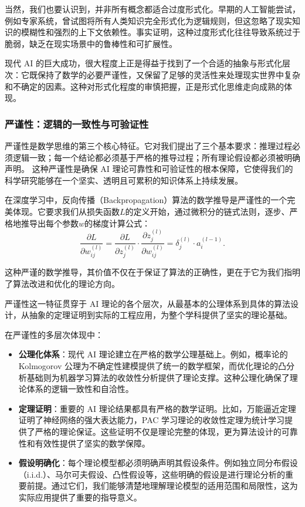当然，我们也要认识到，并非所有概念都适合过度形式化。早期的人工智能尝试，例如专家系统，曾试图将所有人类知识完全形式化为逻辑规则，但这忽略了现实知识的模糊性和强烈的上下文依赖性。事实证明，这种过度形式化往往导致系统过于脆弱，缺乏在现实场景中的鲁棒性和可扩展性。

现代 AI 的巨大成功，很大程度上正是得益于找到了一个合适的抽象与形式化层次：它既保持了数学的必要严谨性，又保留了足够的灵活性来处理现实世界中复杂和不确定的因素。这种对形式化程度的审慎把握，正是形式化思维走向成熟的体现。

\subsubsection{严谨性：逻辑的一致性与可验证性}

严谨性是数学思维的第三个核心特征。它对我们提出了三个基本要求：推理过程必须逻辑一致；每一个结论都必须基于严格的推导过程；所有理论假设都必须被明确声明。
这种严谨性是确保 AI 理论可靠性和可验证性的根本保障，它使得我们的科学研究能够在一个坚实、透明且可累积的知识体系上持续发展。

在深度学习中，反向传播（Backpropagation）算法的数学推导是严谨性的一个完美体现。它要求我们从损失函数$L$的定义开始，通过微积分的链式法则，逐步、严格地推导出每个参数$w$的梯度计算公式：
$$\frac{\partial L}{\partial w_{ij}^{(l)}} = \frac{\partial L}{\partial z_j^{(l)}} \cdot \frac{\partial z_j^{(l)}}{\partial w_{ij}^{(l)}} = \delta_j^{(l)} \cdot a_i^{(l-1)}.$$

这种严谨的数学推导，其价值不仅在于保证了算法的正确性，更在于它为我们指明了算法改进和优化的理论方向。

严谨性这一特征贯穿于 AI 理论的各个层次，从最基本的公理体系到具体的算法设计，从抽象的定理证明到实际的工程应用，为整个学科提供了坚实的理论基础。

在严谨性的多层次体现中：

\begin{itemize}
\item\textbf{公理化体系}：现代 AI 理论建立在严格的数学公理基础上。例如，概率论的 Kolmogorov 公理为不确定性建模提供了统一的数学框架，而优化理论的凸分析基础则为机器学习算法的收敛性分析提供了理论支撑。这种公理化确保了理论体系的逻辑一致性和自洽性。

\item \textbf{定理证明}：重要的 AI 理论结果都具有严格的数学证明。比如，万能逼近定理证明了神经网络的强大表达能力，PAC 学习理论的收敛性定理为统计学习提供了严格的理论保证。这些证明不仅是理论完整的体现，更为算法设计的可靠性和有效性提供了坚实的数学保障。

\item \textbf{假设明确化}：每个理论模型都必须明确声明其假设条件。例如独立同分布假设（i.i.d.）、马尔可夫假设、凸性假设等，这些明确的假设是进行理论分析的重要前提。通过它们，我们能够清楚地理解理论模型的适用范围和局限性，这为实际应用提供了重要的指导意义。
\end{itemize}

